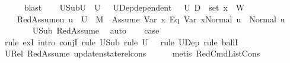 \begin{isabellebody}
\ \ \ \ \isamarkupfalse%
\ blast\isanewline
\ \ \isamarkupfalse%
\ U{}Sub{\isacharprime}{\kern0pt}{\isacharcolon}{\kern0pt}{\isachardoublequoteopen}U{}\ {\isasymsubseteq}\ U{}{\isachardoublequoteclose}\ \ \ U{}Dep{\isacharprime}{\kern0pt}{\isacharcolon}{\kern0pt}{\isachardoublequoteopen}dependent\ {\isasymLambda}{\isacharprime}{\kern0pt}\ {\isasymOmega}\ U{}\ {\isacharparenleft}{\kern0pt}D{}\ {\isasymunion}\ set\ {\isacharparenleft}{\kern0pt}x{}\ {\isacharhash}{\kern0pt}\ W{\isacharparenright}{\kern0pt}{\isacharparenright}{\kern0pt}{\isachardoublequoteclose}\ \ \isanewline
\ \ \ \ RedAssume{}{\isacharcolon}{\kern0pt}{\isachardoublequoteopen}{\isasymAnd}u{\isachardot}{\kern0pt}\ u\ {\isasymin}\ U{}\ {\isasymLongrightarrow}\ M{\isacharcomma}{\kern0pt}{\isasymLambda}{\isacharprime}{\kern0pt}{\isacharcomma}{\kern0pt}{\isasymGamma}{\isacharcomma}{\kern0pt}{\isasymOmega}\ {\isasymturnstile}\ {\isasymlangle}Assume\ {\isacharparenleft}{\kern0pt}{\isacharparenleft}{\kern0pt}Var\ x{}{\isacharparenright}{\kern0pt}\ {\isasymguillemotleft}Eq{\isasymguillemotright}\ {\isacharparenleft}{\kern0pt}Var\ x{}{\isacharparenright}{\kern0pt}{\isacharparenright}{\kern0pt}{\isacharcomma}{\kern0pt}Normal\ u{\isasymrangle}\ {\isasymrightarrow}\ Normal\ u{\isachardoublequoteclose}\isanewline
\ \ \ \ \ \ \isamarkupfalse%
\ U{}Sub\ RedAssume\ \isamarkupfalse%
\ auto\isanewline
\ \ \isamarkupfalse%
\ {\isacharquery}{\kern0pt}case\isanewline
\ \ \ \ \isamarkupfalse%
\ {\isacharparenleft}{\kern0pt}rule\ exI{\isacharcomma}{\kern0pt}\ intro\ conjI{\isacharcomma}{\kern0pt}\ rule\ U{}Sub{\isacharprime}{\kern0pt}{\isacharcomma}{\kern0pt}\ rule\ {\isacartoucheopen}U{}\ {\isasymnoteq}\ {\isacharbraceleft}{\kern0pt}{\isacharbraceright}{\kern0pt}{\isacartoucheclose}{\isacharcomma}{\kern0pt}\ rule\ U{}Dep{\isacharprime}{\kern0pt}{\isacharcomma}{\kern0pt}\ rule\ ballI{\isacharparenright}{\kern0pt}\isanewline
\ \ \ \ \isamarkupfalse%
\ U{}Rel\ RedAssume{}\ update{\isacharunderscore}{\kern0pt}nstate{\isacharunderscore}{\kern0pt}rel{\isacharunderscore}{\kern0pt}cons\isanewline
\ \ \ \ \isamarkupfalse%
\ {\isacharparenleft}{\kern0pt}metis\ RedCmdListCons{\isacharparenright}{\kern0pt}\isanewline
{}\isamarkupfalse%

\end{isabellebody}
